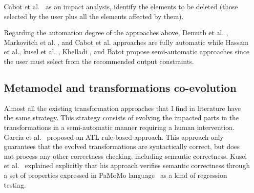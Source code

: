 
Cabot et al.~\cite{cabot2004automatic} as an impact analysis, identify the elements to be deleted (those selected by the user plus all the elements affected by them).

Regarding the automation degree of the approaches above, Demuth et al. \cite{10.1007/978-3-642-41533-3_18}, Markovitch et al. \cite{markovic2008refactoring}, and Cabot et al. \cite{cabot2004automatic} approaches are fully automatic while Hassam et al.\cite{hassam2011assistance}, kusel et al. \cite{kusel2014systematic}, Khelladi \cite{khelladi2017semi}, and Batot \cite{8101267} propose semi-automatic approaches since the user must select from the recommended output constraints. 
\subsection{Metamodel and transformations co-evolution}

Almost all the existing transformation approaches that I find in literature have the same strategy. This strategy consists of evolving the impacted parts in the transformations in a semi-automatic manner requiring a human intervention. 
Garcia et al.~\cite{garcia2012model} proposed an ATL rule-based approach. This approach only guarantees that the evolved transformations are syntactically correct, but does not process any other correctness checking, including semantic correctness. %
  Kusel et al.~\cite{kusel2015consistent} explained explicitly that his approach verifies semantic correctness through a set of properties expressed in PaMoMo language~\cite{10.1007/s10515-012-0102-y} as a kind of regression testing.

